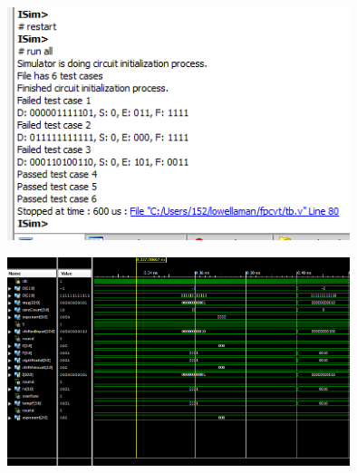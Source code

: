 \documentclass[]{article}
\begin{document}
\includegraphics[width=10cm]{output.PNG}

\includegraphics[width=10cm]{waveform.PNG}




\end{document}
